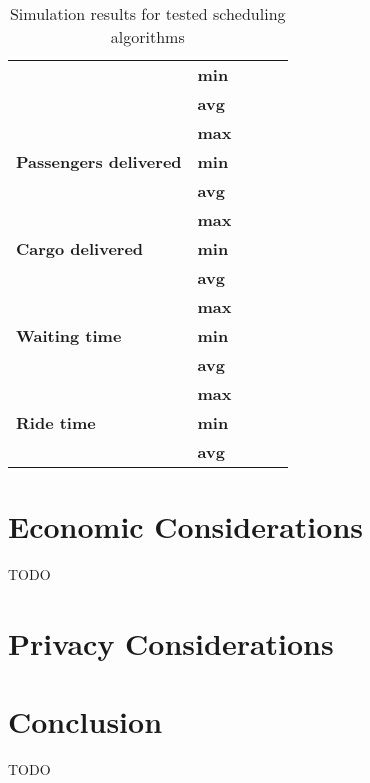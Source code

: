 \begin{table}[]
\begin{tabular}{llrrr}
                                               & \textbf{min} &                   &                    &                  \\
                                               & \textbf{avg} &                   &                    &                  \\
\hline                                               
\multirow{3}{*}{\textbf{Passengers delivered}} & \textbf{max} &                   &                    &                  \\
                                               & \textbf{min} &                   &                    &                  \\
                                               & \textbf{avg} &                   &                    &                  \\
\hline                                               
\multirow{3}{*}{\textbf{Cargo delivered}}      & \textbf{max} &                   &                    &                  \\
                                               & \textbf{min} &                   &                    &                  \\
                                               & \textbf{avg} &                   &                    &                  \\
\hline                                               
\multirow{3}{*}{\textbf{Waiting time}}         & \textbf{max} &                   &                    &                  \\
                                               & \textbf{min} &                   &                    &                  \\
                                               & \textbf{avg} &                   &                    &                  \\
\hline
\multirow{3}{*}{\textbf{Ride time}}            & \textbf{max} &                   &                    &                  \\
                                               & \textbf{min} &                   &                    &                  \\
                                               & \textbf{avg} &                   &                    &                                 
\end{tabular}
\caption{\label{tab:impl:simulationresults} Simulation results for tested scheduling algorithms}
\end{table}

\section{Economic Considerations}
TODO

\section{Privacy Considerations}

\section{Conclusion}
TODO